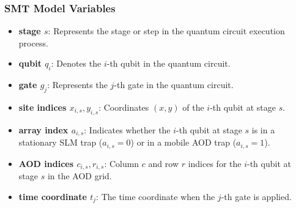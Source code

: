\documentclass[18 pt]{beamer}
\begin{document}
\begin{frame}
    \frametitle{SMT Model Variables}
    \begin{itemize}
        \item \textbf{stage \( s \)}: Represents the stage or step in the quantum circuit execution process.
        \item \textbf{qubit \( q_i \)}: Denotes the \( i \)-th qubit in the quantum circuit.
        \item \textbf{gate \( g_j \)}: Represents the \( j \)-th gate in the quantum circuit.
        \item \textbf{site indices \( x_{i,s}, y_{i,s} \)}: Coordinates \( (x, y) \) of the \( i \)-th qubit at stage \( s \).
        \item \textbf{array index \( a_{i,s} \)}: Indicates whether the \( i \)-th qubit at stage \( s \) is in a stationary SLM trap (\( a_{i,s} = 0 \)) or in a mobile AOD trap (\( a_{i,s} = 1 \)).
        \item \textbf{AOD indices \( c_{i,s}, r_{i,s} \)}: Column \( c \) and row \( r \) indices for the \( i \)-th qubit at stage \( s \) in the AOD grid.
        \item \textbf{time coordinate \( t_j \)}: The time coordinate when the \( j \)-th gate is applied.
    \end{itemize}
\end{frame}
\end{document}
